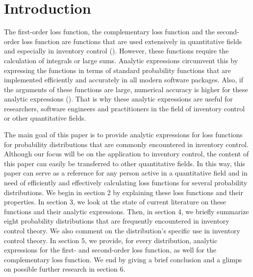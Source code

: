 \documentclass{article}
\begin{document}
\section{Introduction}
\begin{flushleft}
    The first-order loss function, the complementary loss function and the second-order loss function are functions that are used extensively in quantitative fields and especially in inventory control (\cite{Rossi_2014}).
    However, these functions require the calculation of integrals or large sums.
    Analytic expressions circumvent this by expressing the functions in terms of standard probability functions that are implemented efficiently and accurately in all modern software packages.
    Also, if the arguments of these functions are large, numerical accuracy is higher for these analytic expressions (\cite{zipkin2000foundations}).
    That is why these analytic expressions are useful for researchers, software engineers and practitioners in the field of inventory control or other quantitative fields.
\end{flushleft}
\begin{flushleft}
    The main goal of this paper is to provide analytic expressions for loss functions for probability distributions that are commonly encountered in inventory control.
    Although our focus will be on the application to inventory control, the content of this paper can easily be transferred to other quantitative fields.
    In this way, this paper can serve as a reference for any person active in a quantitative field and in need of efficiently and effectively calculating loss functions for several probability distributions.
    We begin in section 2 by explaining these loss functions and their properties.
    In section 3, we look at the state of current literature on these functions and their analytic expressions.
    Then, in section 4, we briefly summarize eight probability distributions that are frequently encountered in inventory control theory.
    We also comment on the distribution's specific use in inventory control theory.
    In section 5, we provide, for every distribution, analytic expressions for the first- and second-order loss function, as well for the complementary loss function.
    We end by giving a brief conclusion and a glimps on possible further research in section 6.
\end{flushleft}
\end{document}
